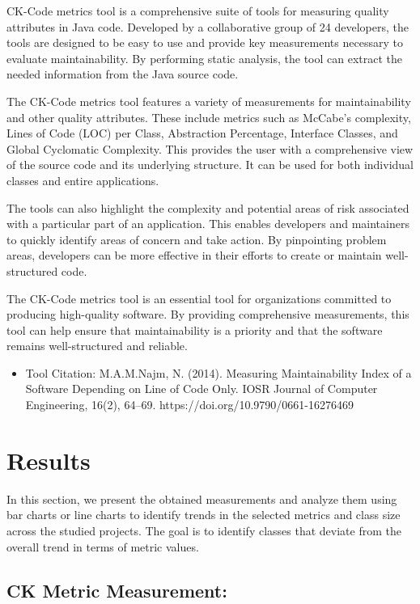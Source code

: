 \documentclass[conference]{IEEEtran}
\begin{document}
	CK-Code metrics tool is a comprehensive suite of tools for measuring quality attributes in Java code. Developed by a collaborative group of 24 developers, the tools are designed to be easy to use and provide key measurements necessary to evaluate maintainability. By performing static analysis, the tool can extract the needed information from the Java source code.
	
	The CK-Code metrics tool features a variety of measurements for maintainability and other quality attributes. These include metrics such as McCabe’s complexity, Lines of Code (LOC) per Class, Abstraction Percentage, Interface Classes, and Global Cyclomatic Complexity. This provides the user with a comprehensive view of the source code and its underlying structure. It can be used for both individual classes and entire applications.
	
	The tools can also highlight the complexity and potential areas of risk associated with a particular part of an application. This enables developers and maintainers to quickly identify areas of concern and take action. By pinpointing problem areas, developers can be more effective in their efforts to create or maintain well-structured code.
	
	The CK-Code metrics tool is an essential tool for organizations committed to producing high-quality software. By providing comprehensive measurements, this tool can help ensure that maintainability is a priority and that the software remains well-structured and reliable.
	\begin{itemize}
		\item Tool Citation: M.A.M.Najm, N. (2014). Measuring Maintainability Index of a Software Depending on Line of Code Only. IOSR Journal of Computer Engineering, 16(2), 64–69. https://doi.org/10.9790/0661-16276469
	\end{itemize}

	\section{Results}	
	In this section, we present the obtained measurements and analyze them using bar charts or line charts to identify trends in the selected metrics and class size across the studied projects. The goal is to identify classes that deviate from the overall trend in terms of metric values.
	\subsection{CK Metric Measurement:}
	
\end{document}
